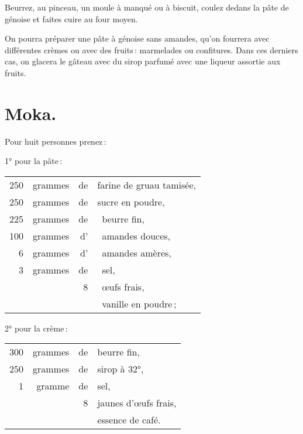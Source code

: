 Beurrez, au pinceau, un moule à manqué ou à biscuit, coulez dedans la pâte de
génoise et faites cuire au four moyen.

\sk

On pourra préparer une pâte à génoise sans amandes, qu'on fourrera avec
différentes crèmes ou avec des fruits : marmelades ou confitures. Dans ces
derniers cas, on glacera le gâteau avec du sirop parfumé avec une liqueur
assortie aux fruits.

\section*{\centering Moka.}
{}

Pour huit personnes prenez :

\medskip

1° pour la pâte :

\footnotesize
\begin{longtable}{rrrp{16em}}
    250 & grammes & de & farine de gruau tamisée,                                                         \\
    250 & grammes & de & sucre en poudre,                                                                 \\
    225 & grammes & de & beurre fin,                                                                      \\
    100 & grammes & d’ & amandes douces,                                                                  \\
      6 & grammes & d' & amandes amères,                                                                  \\
      3 & grammes & de & sel,                                                                             \\
        &         &  8 & œufs frais,                                                                      \\
        &         &    & vanille en poudre ;                                                              \\
\end{longtable}
\normalsize

2° pour la crème :

\footnotesize
\begin{longtable}{rrrp{16em}}
    300 & grammes & de & beurre fin,                                                                      \\
    250 & grammes & de & sirop à 32°,                                                                     \\
      1 & gramme  & de & sel,                                                                             \\
        &         &  8 & jaunes d'œufs frais,                                                             \\
        &         &    & essence de café.                                                                 \\
\end{longtable}
\normalsize

